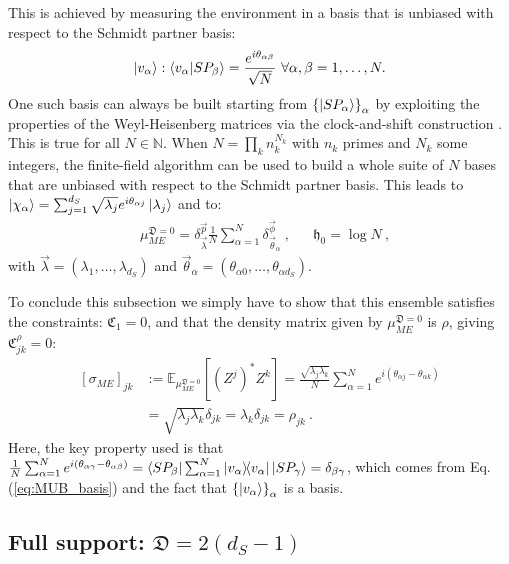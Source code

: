 \documentclass[draft,nofootinbib,pre,twocolumn,showpacs,showkeys,groupaddress,preprintnumbers,floatfix]{revtex4-1}
\newcommand{\1}{\mathbbm{1}}
\newcommand{\ID}{\mathfrak{D}}
\begin{document}
This is achieved by measuring the environment in a basis that is unbiased with respect to the 
Schmidt partner basis: 
\begin{equation}
\ket{v_\alpha}: \braket{v_\alpha}{SP_\beta} = \frac{e^{i\theta_{\alpha \beta}}}{\sqrt{N}}~\forall \alpha,\beta=1,\ldots,N.\label{eq:MUB_basis}
\end{equation}
One such basis can always be built starting from $\left\{\ket{SP_\alpha}\right\}_\alpha$ by exploiting the properties of the
Weyl-Heisenberg matrices via the clock-and-shift construction \cite{Vourdas04}. This is true for all $N \in \mathbb{N}$. When 
$N = \prod_{k}n_k^{N_k}$ with $n_k$ primes and $N_k$ some integers, the finite-field algorithm \cite{Bengtsson07,Lawrence02} can be 
used to build a whole suite of $N$ bases that are unbiased with respect to the Schmidt partner basis. 
This leads to $\ket{\chi_\alpha} = \sum_{j=1}^{d_S} \sqrt{\lambda_j} e^{i\theta_{\alpha j}}\ket{\lambda_j}$ and to:
\begin{align*}
&\mu_{ME}^{\ID=0} = \delta^{\vec{p}}_{\vec{\lambda}} \frac{1}{N}\sum_{\alpha=1}^{N} \delta^{\vec{\phi}}_{\vec{\theta}_\alpha}~, &&\mathfrak{h}_0 = \log N
  ~,
\end{align*}
with $\vec{\lambda} = (\lambda_1,\ldots,\lambda_{d_S})$ and $\vec{\theta}_\alpha = (\theta_{\alpha0},\ldots,\theta_{\alpha d_S})$.

To conclude this subsection we simply have to show that this ensemble satisfies the constraints: 
$\mathfrak{C}_1=0$, and that the density matrix given by $\mu_{ME}^{\ID=0}$ is $\rho$, giving $\mathfrak{C}_{jk}^{\rho}=0$:
\begin{align*}
\left[\sigma_{ME}\right]_{jk}&:=\mathbb{E}_{\mu_{ME}^{\ID=0}}\left[ \left(Z^{j}\right)^{*}Z^{k}\right] = \frac{\sqrt{\lambda_j \lambda_k}}{N}\sum_{\alpha=1}^{N} e^{i(\theta_{\alpha j}- \theta_{\alpha k})} \nonumber\\
& = \sqrt{\lambda_j \lambda_k} \delta_{jk} = \lambda_k \delta_{jk} = \rho_{jk}
  ~.
\end{align*}
Here, the key property used is that $\frac{1}{N}\sum_{\alpha=1}^N
e^{i(\theta_{\alpha \gamma} - \theta_{\alpha \beta})} = \bra{SP_\beta}
\sum_{\alpha =1}^N  \ketbra{v_\alpha}{v_\alpha} \ket{SP_{\gamma}}=\delta_{\beta
\gamma}$, which comes from Eq. (\ref{eq:MUB_basis}) and the fact that $\left\{ \ket{v_\alpha}\right\}_{\alpha}$
is a basis.

\subsection*{Full support: $\ID = 2(d_S-1)$}
\end{document}
